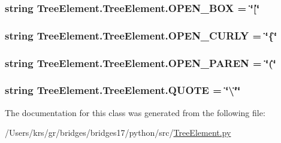 \subsubsection[{O\+P\+E\+N\+\_\+\+B\+O\+X}]{\setlength{\rightskip}{0pt plus 5cm}string Tree\+Element.\+Tree\+Element.\+O\+P\+E\+N\+\_\+\+B\+O\+X = \char`\"{}\mbox{[}\char`\"{}\hspace{0.3cm}{\ttfamily [static]}}\label{class_tree_element_1_1_tree_element_a0f49fc3331346c2ba3a8db5e50c1710a}
\hypertarget{class_tree_element_1_1_tree_element_a8527e74740e4c2e04fdd4387f1cc89a9}{}
\subsubsection[{O\+P\+E\+N\+\_\+\+C\+U\+R\+L\+Y}]{\setlength{\rightskip}{0pt plus 5cm}string Tree\+Element.\+Tree\+Element.\+O\+P\+E\+N\+\_\+\+C\+U\+R\+L\+Y = \char`\"{}\{\char`\"{}\hspace{0.3cm}{\ttfamily [static]}}\label{class_tree_element_1_1_tree_element_a8527e74740e4c2e04fdd4387f1cc89a9}
\hypertarget{class_tree_element_1_1_tree_element_a543ac127f5fe123828075efe7de84eef}{}
\subsubsection[{O\+P\+E\+N\+\_\+\+P\+A\+R\+E\+N}]{\setlength{\rightskip}{0pt plus 5cm}string Tree\+Element.\+Tree\+Element.\+O\+P\+E\+N\+\_\+\+P\+A\+R\+E\+N = \char`\"{}(\char`\"{}\hspace{0.3cm}{\ttfamily [static]}}\label{class_tree_element_1_1_tree_element_a543ac127f5fe123828075efe7de84eef}
\hypertarget{class_tree_element_1_1_tree_element_a65174e78fa3608767a4c39e3a57b3e7b}{}
\subsubsection[{Q\+U\+O\+T\+E}]{\setlength{\rightskip}{0pt plus 5cm}string Tree\+Element.\+Tree\+Element.\+Q\+U\+O\+T\+E = \char`\"{}\textbackslash{}\char`\"{}\char`\"{}\hspace{0.3cm}{\ttfamily [static]}}\label{class_tree_element_1_1_tree_element_a65174e78fa3608767a4c39e3a57b3e7b}


The documentation for this class was generated from the following file\+:\begin{DoxyCompactItemize}
\item 
/\+Users/krs/gr/bridges/bridges17/python/src/\hyperlink{_tree_element_8py}{Tree\+Element.\+py}\end{DoxyCompactItemize}
